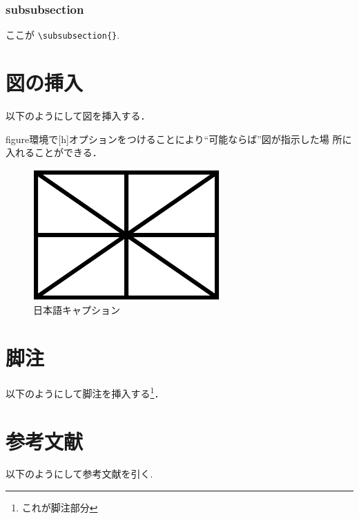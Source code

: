 \documentclass{jsarticle}
\begin{document}
\subsubsection{subsubsection}

ここが \verb|\subsubsection{}|.


\section{図の挿入}

以下のようにして図を挿入する．

figure環境で[h]オプションをつけることにより``可能ならば''図が指示した場
所に入れることができる．

\begin{figure}[h]
\centerline{
	\includegraphics[mediaboxonly,width=\columnwidth]{figure.pdf}
}
\caption{日本語キャプション}
\label{fig:figure}
\end{figure}

\section{脚注}

以下のようにして脚注を挿入する\footnote{これが脚注部分}．

\section{参考文献}

以下のようにして参考文献を引く\cite{Author1:08}.
\end{document}
